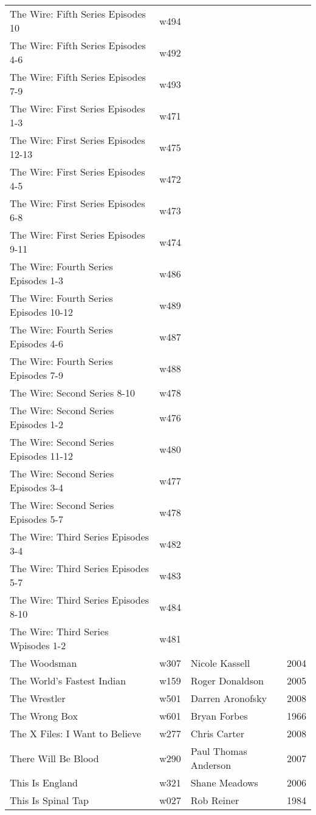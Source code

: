 \documentclass{article}
\begin{document}
\begin {center}
\begin{longtable}{p{10cm} l l l}
The Wire: Fifth Series Episodes 10 & w494 &  &  \\
The Wire: Fifth Series Episodes 4-6 & w492 &  &  \\
The Wire: Fifth Series Episodes 7-9 & w493 &  &  \\
The Wire: First Series Episodes 1-3 & w471 &  &  \\
The Wire: First Series Episodes 12-13 & w475 &  &  \\
The Wire: First Series Episodes 4-5 & w472 &  &  \\
The Wire: First Series Episodes 6-8 & w473 &  &  \\
The Wire: First Series Episodes 9-11 & w474 &  &  \\
The Wire: Fourth Series Episodes 1-3 & w486 &  &  \\
The Wire: Fourth Series Episodes 10-12 & w489 &  &  \\
The Wire: Fourth Series Episodes 4-6 & w487 &  &  \\
The Wire: Fourth Series Episodes 7-9 & w488 &  &  \\
The Wire: Second Series 8-10 & w478 &  &  \\
The Wire: Second Series Episodes 1-2 & w476 &  &  \\
The Wire: Second Series Episodes 11-12 & w480 &  &  \\
The Wire: Second Series Episodes 3-4 & w477 &  &  \\
The Wire: Second Series Episodes 5-7 & w478 &  &  \\
The Wire: Third Series Episodes 3-4 & w482 &  &  \\
The Wire: Third Series Episodes 5-7 & w483 &  &  \\
The Wire: Third Series Episodes 8-10 & w484 &  &  \\
The Wire: Third Series Wpisodes 1-2 & w481 &  &  \\
The Woodsman & w307 & Nicole Kassell & 2004 \\
The World's Fastest Indian & w159 & Roger Donaldson & 2005 \\
The Wrestler & w501 & Darren Aronofsky & 2008 \\
The Wrong Box & w601 & Bryan Forbes & 1966 \\
The X Files: I Want to Believe & w277 & Chris Carter & 2008 \\
There Will Be Blood & w290 & Paul Thomas Anderson & 2007 \\
This Is England & w321 & Shane Meadows & 2006 \\
This Is Spinal Tap & w027 & Rob Reiner & 1984 \\

\end{longtable}
\end{center}
\end{document}

